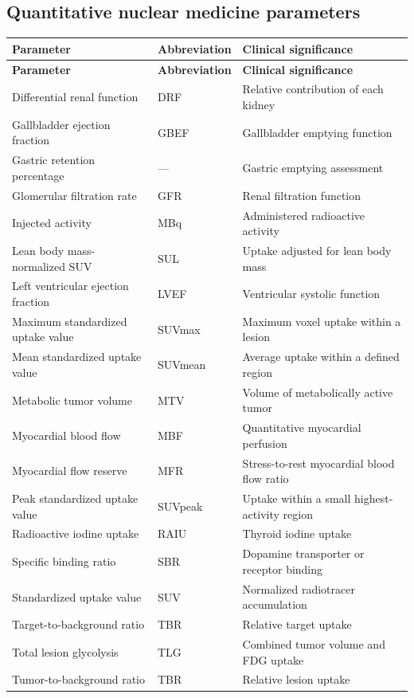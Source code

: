 \subsection{Quantitative nuclear medicine parameters}
\begin{longtable}{@{}p{}p{}p{}@{}}
\toprule
\textbf{Parameter} & \textbf{Abbreviation} & \textbf{Clinical significance} \\
\midrule
\endfirsthead
\toprule
\textbf{Parameter} & \textbf{Abbreviation} & \textbf{Clinical significance} \\
\midrule
\endhead
Differential renal function & DRF & Relative contribution of each kidney \\
Gallbladder ejection fraction & GBEF & Gallbladder emptying function \\
Gastric retention percentage & --- & Gastric emptying assessment \\
Glomerular filtration rate & GFR & Renal filtration function \\
Injected activity & MBq & Administered radioactive activity \\
Lean body mass-normalized SUV & SUL & Uptake adjusted for lean body mass \\
Left ventricular ejection fraction & LVEF & Ventricular systolic function \\
Maximum standardized uptake value & SUVmax & Maximum voxel uptake within a lesion \\
Mean standardized uptake value & SUVmean & Average uptake within a defined region \\
Metabolic tumor volume & MTV & Volume of metabolically active tumor \\
Myocardial blood flow & MBF & Quantitative myocardial perfusion \\
Myocardial flow reserve & MFR & Stress-to-rest myocardial blood flow ratio \\
Peak standardized uptake value & SUVpeak & Uptake within a small highest-activity region \\
Radioactive iodine uptake & RAIU & Thyroid iodine uptake \\
Specific binding ratio & SBR & Dopamine transporter or receptor binding \\
Standardized uptake value & SUV & Normalized radiotracer accumulation \\
Target-to-background ratio & TBR & Relative target uptake \\
Total lesion glycolysis & TLG & Combined tumor volume and FDG uptake \\
Tumor-to-background ratio & TBR & Relative lesion uptake \\
\bottomrule
\end{longtable}

